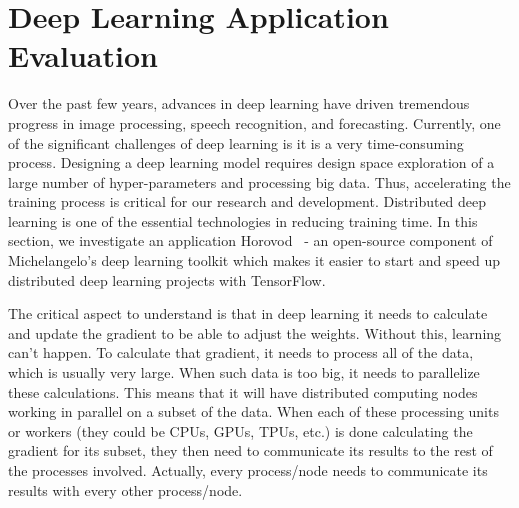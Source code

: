 \documentclass[sigconf]{acmart}
\begin{document}
\section{Deep Learning Application Evaluation}\label{sec:application}
Over the past few years, advances in deep learning have driven tremendous progress in image
processing, speech recognition, and forecasting. Currently, one of the significant challenges
of deep learning is it is a very time-consuming process. Designing a deep learning model
requires design space exploration of a large number of hyper-parameters and processing big data.
Thus, accelerating the training process is critical for our research and development.
Distributed deep learning is one of the essential technologies in reducing training time.
In this section, we investigate an application Horovod~\cite{sergeev2018horovod} - an
open-source component of Michelangelo's deep learning toolkit which makes it easier to start and speed
up distributed deep learning projects with TensorFlow.

The critical aspect to understand is that in deep learning it needs to calculate and update the gradient
to be able to adjust the weights. Without this, learning can't happen.
To calculate that gradient, it needs to process all of the data, which is usually
very large. When such data is too big, it needs to parallelize these calculations.
This means that it will have distributed computing nodes working in parallel on a
subset of the data. When each of these processing units or workers (they could be
CPUs, GPUs, TPUs, etc.) is done calculating the gradient for its subset, they then
need to communicate its results to the rest of the processes involved. Actually,
every process/node needs to communicate its results with every other process/node.
\end{document}
